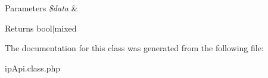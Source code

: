 \begin{DoxyParams}{Parameters}
{\em \$data} & \\
\hline
\end{DoxyParams}
\begin{DoxyReturn}{Returns}
bool$|$mixed 
\end{DoxyReturn}


The documentation for this class was generated from the following file\-:\begin{DoxyCompactItemize}
\item 
ip\-Api.\-class.\-php\end{DoxyCompactItemize}
